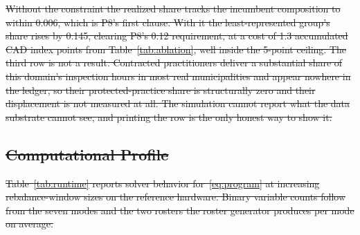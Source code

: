 \documentclass[utf8]{FrontiersinHarvard}
\providecommand{\DIFdel}[1]{{\protect\color{red}\sout{#1}}}                      %
\begin{document}
\DIFdel{Without the constraint the realized share tracks the incumbent composition to within 0.006, which is P8's first clause. With it the least-represented group's share rises by 0.145, clearing P8's 0.12 requirement, at a cost of 1.3 accumulated CAD index points from Table~\ref{tab:ablation}, well inside the 5-point ceiling. The third row is not a result. Contracted practitioners deliver a substantial share of this domain's inspection hours in most real municipalities and appear nowhere in the ledger, so their protected-practice share is structurally zero and their displacement is not measured at all. The simulation cannot report what the data substrate cannot see, and printing the row is the only honest way to show it.
	}%


\subsection{\DIFdel{Computational Profile}}
\addtocounter{subsection}{-1}%

\DIFdel{Table~\ref{tab:runtime} reports solver behavior for~\eqref{eq:program} at increasing rebalance-window sizes on the reference hardware. Binary variable counts follow from the seven modes and the two rosters the roster generator produces per mode on average.
	}%
\end{document}
